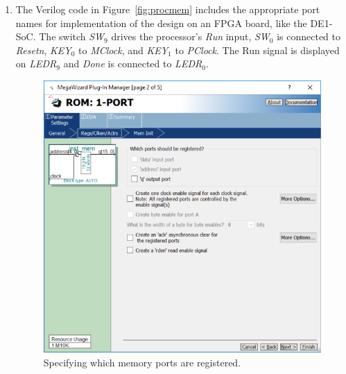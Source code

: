 \documentclass[epsfig,10pt,fullpage]{article} \addtolength{\textwidth}{1.5in}
\begin{document}
\begin{enumerate}
\item The Verilog code in Figure~\ref{fig:procmem} includes the appropriate 
port names for implementation of the design on an FPGA board, like the DE1-SoC.
The switch {\it SW}$_{9}$ drives the processor's {\it Run} input, {\it SW}$_0$ is
connected to {\it Resetn}, {\it KEY}$_0$ to {\it MClock}, and {\it KEY}$_1$ to {\it PClock}.
The Run signal is displayed on {\it LEDR}$_{9}$ and {\it Done} is connected to {\it LEDR}$_{0}$.
\begin{figure}[H]
	\begin{center}
		\includegraphics[scale=1.0]{figures/figure8.png}
	\end{center}
	\caption{Specifying which memory ports are registered.}
	\label{fig:fig8}
\end{figure}


\end{enumerate}
\end{document}
